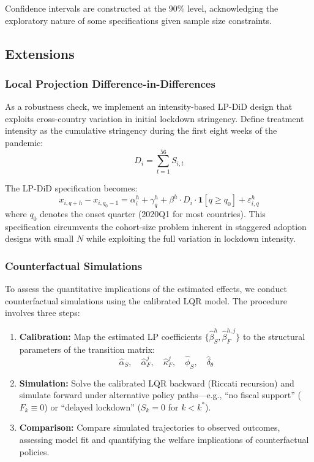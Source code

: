 \documentclass[12pt, a4paper]{article}
\begin{document}
Confidence intervals are constructed at the 90\% level, acknowledging the exploratory nature of some specifications given sample size constraints.
\newpage
\subsection{Extensions}

\subsubsection{Local Projection Difference-in-Differences}

As a robustness check, we implement an intensity-based LP-DiD design that exploits cross-country variation in initial lockdown stringency. Define treatment intensity as the cumulative stringency during the first eight weeks of the pandemic:
\begin{equation}
    D_i = \sum_{t=1}^{56} S_{i,t}
\end{equation}

The LP-DiD specification becomes:
\begin{equation}
    x_{i,q+h} - x_{i,q_0-1} = \alpha^h_i + \gamma^h_q + \beta^h \cdot D_i \cdot \mathbf{1}[q \geq q_0] + \varepsilon^h_{i,q}
    \label{eq:LP_DiD}
\end{equation}
where $q_0$ denotes the onset quarter (2020Q1 for most countries). This specification circumvents the cohort-size problem inherent in staggered adoption designs with small $N$ while exploiting the full variation in lockdown intensity.

\subsubsection{Counterfactual Simulations}

To assess the quantitative implications of the estimated effects, we conduct counterfactual simulations using the calibrated LQR model. The procedure involves three steps:

\begin{enumerate}
    \item \textbf{Calibration:} Map the estimated LP coefficients $\{\hat{\beta}^h_S, \hat{\beta}^{h,j}_F\}$ to the structural parameters of the transition matrix:
    \begin{equation}
        \hat{\alpha}_S, \quad \hat{\alpha}^j_F, \quad \hat{\kappa}^j_F, \quad \hat{\phi}_S, \quad \hat{\delta}_\theta
    \end{equation}
    
    \item \textbf{Simulation:} Solve the calibrated LQR backward (Riccati recursion) and simulate forward under alternative policy paths—e.g., ``no fiscal support'' ($F_k \equiv 0$) or ``delayed lockdown'' ($S_k = 0$ for $k < k^*$).
    
    \item \textbf{Comparison:} Compare simulated trajectories to observed outcomes, assessing model fit and quantifying the welfare implications of counterfactual policies.
\end{enumerate}
\end{document}
